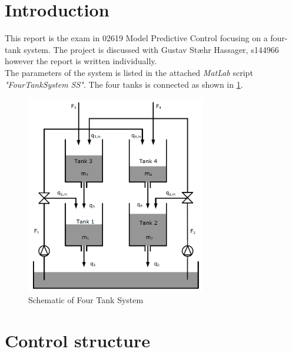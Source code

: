 \newpage 
\section*{Introduction}
This report is the exam in 02619 Model Predictive Control focusing on a four-tank system. The project is discussed with Gustav Stæhr Hassager, s144966 however the report is written individually. \\
The parameters of the system is listed in the attached \textit{MatLab} script \textit{"FourTankSystem SS"}. The four tanks is connected as shown in \cref{fig:Schematic}.
\begin{figure}[H]
    \centering
    \includegraphics[width=0.7\textwidth]{Figures/FourTankSys.PNG}
    \caption{Schematic of Four Tank System}
    \label{fig:Schematic}
\end{figure}
\section{Control structure}


